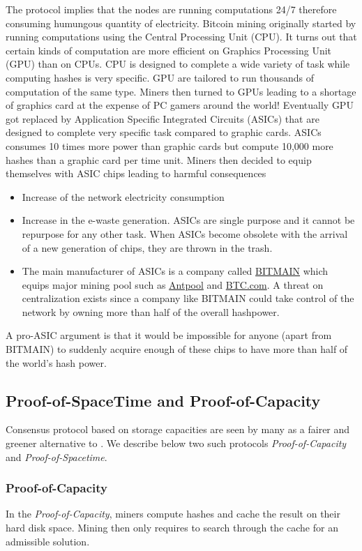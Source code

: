 \noindent The \PoW protocol implies that the nodes are running computations 24/7 therefore consuming humungous quantity of electricity. Bitcoin mining originally started by running computations using the Central Processing Unit (CPU). It turns out that certain kinds of computation are more efficient on Graphics Processing Unit (GPU) than on CPUs. CPU is designed to complete a wide variety of task while computing hashes is very specific. GPU are tailored to run thousands of computation of the same type. Miners then turned to GPUs leading to a shortage of graphics card at the expense of PC gamers around the world! Eventually GPU got replaced by Application Specific Integrated Circuits (ASICs) that are designed to complete very specific task compared to graphic cards. ASICs consumes 10 times more power than graphic cards but compute 10,000 more hashes than a graphic card per time unit. Miners then decided to equip themselves with ASIC chips leading to harmful consequences
\begin{itemize}
    \item Increase of the network electricity consumption
    \item Increase in the e-waste generation. ASICs are single purpose and it cannot be repurpose for any other task. When ASICs become obsolete with the arrival of a new generation of chips, they are thrown in the trash.
    \item The main manufacturer of ASICs is a company called \href{https://www.bitmain.com/}{BITMAIN} which equips major mining pool such as \href{https://v3.antpool.com/home}{Antpool} and \href{https://btc.com}{BTC.com}. A threat on centralization exists since a company like BITMAIN could take control of the network by owning more than half of the overall hashpower.
\end{itemize} 
A pro-ASIC argument is that it would be impossible for anyone (apart from BITMAIN) to suddenly acquire enough of these chips to have more than half of the world's hash power.
\subsection{Proof-of-SpaceTime and Proof-of-Capacity}\label{ssec:posp}
Consensus protocol based on storage capacities are seen by many as a fairer and greener alternative to \PoW. We describe below two such protocols \textit{Proof-of-Capacity} and \textit{Proof-of-Spacetime}.
\subsubsection{Proof-of-Capacity}
In the \textit{Proof-of-Capacity}, miners compute hashes and cache the result on their hard disk space. Mining then only requires to search through the cache for an admissible solution.
